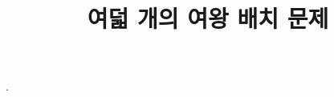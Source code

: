 \documentclass{article}
\title{여덟 개의 여왕 배치 문제}
\author{}
\date{}
\begin{document}
\maketitle

.
\end{document}

